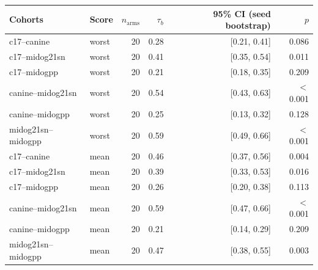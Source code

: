 \begin{tabular}{llrrrr}
\toprule
Cohorts & Score & $n_\text{arms}$ & $\tau_b$ & 95\% CI (seed bootstrap) & $p$ \\
\midrule
c17--canine & worst & 20 & 0.28 & [0.21, 0.41] & 0.086 \\
c17--midog21sn & worst & 20 & 0.41 & [0.35, 0.54] & 0.011 \\
c17--midogpp & worst & 20 & 0.21 & [0.18, 0.35] & 0.209 \\
canine--midog21sn & worst & 20 & 0.54 & [0.43, 0.63] & $<$0.001 \\
canine--midogpp & worst & 20 & 0.25 & [0.13, 0.32] & 0.128 \\
midog21sn--midogpp & worst & 20 & 0.59 & [0.49, 0.66] & $<$0.001 \\
c17--canine & mean & 20 & 0.46 & [0.37, 0.56] & 0.004 \\
c17--midog21sn & mean & 20 & 0.39 & [0.33, 0.53] & 0.016 \\
c17--midogpp & mean & 20 & 0.26 & [0.20, 0.38] & 0.113 \\
canine--midog21sn & mean & 20 & 0.59 & [0.47, 0.66] & $<$0.001 \\
canine--midogpp & mean & 20 & 0.21 & [0.14, 0.29] & 0.209 \\
midog21sn--midogpp & mean & 20 & 0.47 & [0.38, 0.55] & 0.003 \\
\bottomrule
\end{tabular}
